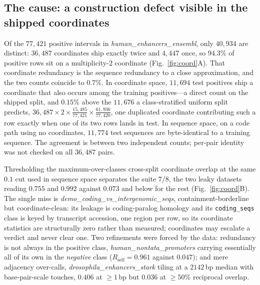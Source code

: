 \documentclass[webpdf,modern,large,namedate]{oup-authoring-template}%
\begin{document}
\subsection{The cause: a construction defect visible in the shipped coordinates}\label{sec:r-coord}
Of the $77{,}421$ positive intervals in \textit{human\_enhancers\_ensembl}, only $40{,}934$ are distinct: $36{,}487$ coordinates ship exactly twice and $4{,}447$ once, so $94.3\%$ of positive rows sit on a multiplicity-$2$ coordinate (Fig.~\ref{fig:coord}A). That coordinate redundancy is the sequence redundancy to a close approximation, and the two counts coincide to $0.7\%$. In coordinate space, $11{,}694$ test positives ship a coordinate that also occurs among the training positives---a direct count on the shipped split, and $0.15\%$ above the $11{,}676$ a class-stratified uniform split predicts, $36{,}487\times2\times\tfrac{15{,}485}{77{,}421}\times\tfrac{61{,}936}{77{,}420}$, one duplicated coordinate contributing such a row exactly when one of its two rows lands in test. In sequence space, on a code path using no coordinates, $11{,}774$ test sequences are byte-identical to a training sequence. The agreement is between two independent counts; per-pair identity was not checked on all $36{,}487$ pairs.

Thresholding the maximum-over-classes cross-split coordinate overlap at the same $0.1$ cut used in sequence space separates the suite $7/8$, the two leaky datasets reading $0.755$ and $0.992$ against $0.073$ and below for the rest (Fig.~\ref{fig:coord}B). The single miss is \textit{demo\_coding\_vs\_intergenomic\_seqs}, containment-borderline but coordinate-clean: its leakage is coding-paralog homology and its \texttt{coding\_seqs} class is keyed by transcript accession, one region per row, so its coordinate statistics are structurally zero rather than measured; coordinates may escalate a verdict and never clear one. Two refinements were forced by the data: redundancy is not always in the positive class, \textit{human\_nontata\_promoters} carrying essentially all of its own in the \emph{negative} class ($R_{\mathrm{self}}=0.961$ against $0.047$); and mere adjacency over-calls, \textit{drosophila\_enhancers\_stark} tiling at a $2142$\,bp median with base-pair-scale touches, $0.406$ at ${\ge}1$\,bp but $0.036$ at $\ge50\%$ reciprocal overlap.
\end{document}
